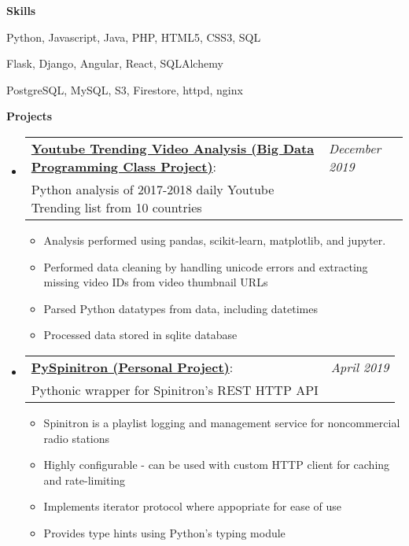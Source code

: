 \documentclass[letterpaper,11pt]{article}
\makeatletter
\newcommand{\resitem}[1]{\item #1 \vspace{-2pt}}
\newcommand{\resheading}[1]{{\large \colorbox{mygrey}{\begin{minipage}{\textwidth}{\textbf{#1 \vphantom{p\^{E}}}}\end{minipage}}}}
\newcommand{\projectheading}[3]{
\begin{tabular*}{6.5in}{l@{\extracolsep{\fill}}l}
\textbf{#1}: & \textit{#3}\\
\footnotesize{#2} 
\end{tabular*}
\vspace{-6pt}
}
\makeatother
\begin{document}
    \resheading{Skills}
    \begin{description}[labelindent=1em]
        \item[Languages:] { \footnotesize
        Python, Javascript, Java, PHP, HTML5, CSS3, SQL
        }
        \item[Frameworks \& Libraries:] { \footnotesize
        Flask, Django, Angular, React, SQLAlchemy
        }
        \item[Databases \& Servers: ]{\footnotesize
        PostgreSQL, MySQL, S3, Firestore, httpd, nginx}

    \end{description} %

    \resheading{Projects}

    \begin{itemize}[leftmargin=*]
    \item[]{
            \projectheading{\href{https://github.com/slogsdon7/csc4760_project/}{Youtube Trending Video Analysis (Big Data Programming Class Project)}}{Python analysis of 2017-2018 daily Youtube Trending list from 10 countries}{December 2019}
            \footnotesize{
            \begin{itemize}
                \resitem{Analysis performed using pandas, scikit-learn, matplotlib, and jupyter.}
                \resitem{Performed data cleaning by handling unicode errors and extracting missing video IDs from video thumbnail URLs}
                \resitem{Parsed Python datatypes from data, including datetimes}
                \resitem{Processed data stored in sqlite database}
            \end{itemize}
            }
    }
        \item[]{
        \projectheading{\href{https://github.com/slogsdon7/spinitron}{PySpinitron (Personal Project)}}{Pythonic wrapper for Spinitron's REST HTTP API}{April 2019}
         \footnotesize{
         \begin{itemize}
             \resitem {Spinitron is a playlist logging and management service for noncommercial radio stations}
             \resitem {Highly configurable - can be used with custom HTTP client for caching and rate-limiting}
             \resitem {Implements iterator protocol where appopriate for ease of use}
             \resitem {Provides type hints using Python's typing module}
         \end{itemize}
        }
        }


\end{itemize}
\end{document}
